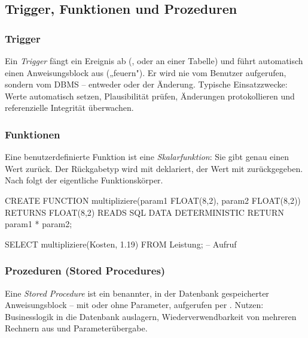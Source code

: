 \subsection{Trigger, Funktionen und Prozeduren}
\subsubsection{Trigger}
Ein \emph{Trigger} fängt ein Ereignis ab (,  oder  an einer Tabelle) und führt automatisch einen Anweisungsblock aus („feuern"). Er wird nie vom Benutzer aufgerufen, sondern vom DBMS -- entweder  oder  der Änderung. Typische Einsatzzwecke: Werte automatisch setzen, Plausibilität prüfen, Änderungen protokollieren und referenzielle Integrität überwachen.

\subsubsection{Funktionen}
Eine benutzerdefinierte Funktion ist eine \emph{Skalarfunktion}: Sie gibt genau einen Wert zurück. Der Rückgabetyp wird mit  deklariert, der Wert mit  zurückgegeben. Nach  folgt der eigentliche Funktionskörper.

\begin{syntaxbox}[SQL]
CREATE FUNCTION multipliziere(param1 FLOAT(8,2), param2 FLOAT(8,2))
RETURNS FLOAT(8,2)
READS SQL DATA
DETERMINISTIC
RETURN param1 * param2;

SELECT multipliziere(Kosten, 1.19) FROM Leistung;   -- Aufruf
\end{syntaxbox}

\subsubsection{Prozeduren (Stored Procedures)}
Eine \emph{Stored Procedure} ist ein benannter, in der Datenbank gespeicherter Anweisungsblock -- mit oder ohne Parameter, aufgerufen per . Nutzen: Businesslogik in die Datenbank auslagern, Wiederverwendbarkeit von mehreren Rechnern aus und Parameterübergabe.
